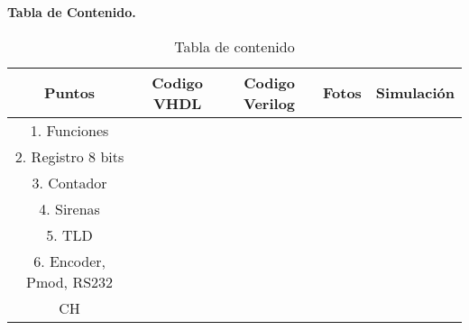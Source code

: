 
\newpage
\textbf{Tabla de Contenido.}

\begin{table}[H]
    \centering
\begin{tabular}{|c|c|c|c|c|}
\hline
Puntos & Codigo VHDL & Codigo Verilog & Fotos  & Simulación \bigstrut\\
\hline
1. Funciones &   &   &   &  \bigstrut\\
\hline
2. Registro 8 bits &   &   &   &  \bigstrut\\
\hline
3. Contador &   &   &   &  \bigstrut\\
\hline
4. Sirenas & \cellcolor[rgb]{ .816,  .816,  .816} &   &   & \cellcolor[rgb]{ .816,  .816,  .816} \bigstrut\\
\hline
5. TLD  &   &   &   & \cellcolor[rgb]{ .816,  .816,  .816} \bigstrut\\
\hline
\multicolumn{1}{|p{7.665em}|}{6. Encoder, Pmod, RS232} &   & \cellcolor[rgb]{ .816,  .816,  .816} &   & \cellcolor[rgb]{ .816,  .816,  .816} \bigstrut\\
\hline
CH & \cellcolor[rgb]{ .816,  .816,  .816} & \cellcolor[rgb]{ .816,  .816,  .816} & \cellcolor[rgb]{ .816,  .816,  .816} & \cellcolor[rgb]{ .816,  .816,  .816} \bigstrut\\
\hline
\end{tabular}%
    \caption{Tabla de contenido}
    \label{tab:Tabla de contenido}
\end{table}